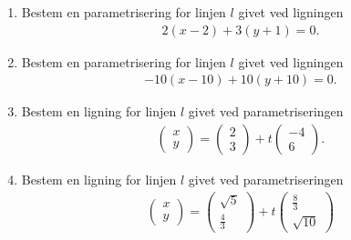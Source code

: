\begin{enumerate}[label=\roman*)]
\item Bestem en parametrisering for linjen $l$ givet ved ligningen 
\begin{align*}
2(x-2) + 3(y+1) = 0.
\end{align*}
\item Bestem en parametrisering for linjen $l$ givet ved ligningen 
\begin{align*}
-10(x-10) + 10(y+10) = 0.
\end{align*}
\item Bestem en ligning for linjen $l$ givet ved parametriseringen 
\begin{align*}
\begin{pmatrix}
x \\ y
\end{pmatrix}
= 
\begin{pmatrix}
2 \\ 3
\end{pmatrix}
+
t
\begin{pmatrix}
-4 \\ 6
\end{pmatrix}.
\end{align*}
\item Bestem en ligning for linjen $l$ givet ved parametriseringen 
\begin{align*}
\begin{pmatrix}
x \\ y
\end{pmatrix}
= 
\begin{pmatrix}
\sqrt{5} \\ \frac{4}{3}
\end{pmatrix}
+
t
\begin{pmatrix}
\frac{8}{3} \\ \sqrt{10}
\end{pmatrix}
\end{align*}
\end{enumerate}

